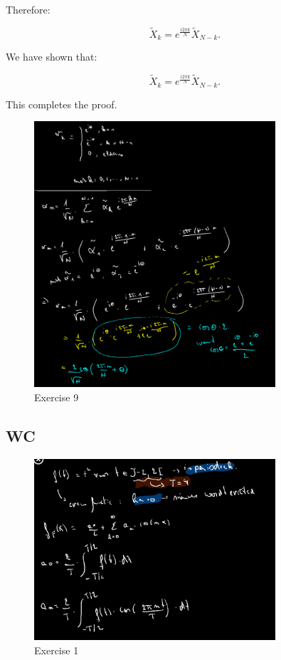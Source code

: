 \documentclass[a4paper]{report}
\begin{document}
Therefore:

\[
	\widetilde{X}_k = e^{\frac{i2\pi k}{N}} \widetilde{X}_{N - k}.
\]

We have shown that:

\[
	\widetilde{X}_k = e^{\frac{i2\pi k}{N}} \widetilde{X}_{N - k}.
\]

This completes the proof.

\begin{figure}[H]
	\centering
	\includegraphics[width=0.8\textwidth]{assets/huis_9_ex_9.png}
	\caption{Exercise 9}
	\label{fig:huis_9_ex_9}
\end{figure}

\subsection{WC}

\begin{figure}[H]
	\centering
	\includegraphics[width=0.8\textwidth]{assets/wc_9_ex_1.png}
	\caption{Exercise 1}
	\label{fig:wc_9_ex_1}
\end{figure}
\end{document}
